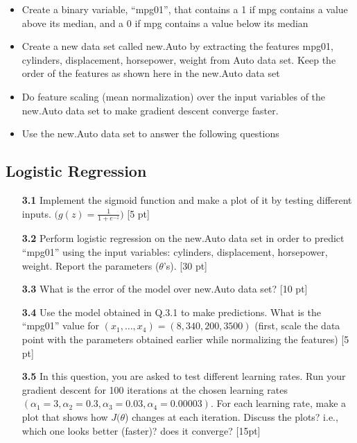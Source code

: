 \documentclass[a4paper,12pt]{article}
\newcommand{\quotes}[1]{``#1''}
\begin{document}
\begin{itemize}
\item  Create a binary variable, \quotes{mpg01}, that contains a 1 if mpg contains a value above its median, and a 0 if mpg contains a value below its median
\item Create a new data set called new.Auto by extracting the features mpg01, cylinders, displacement, horsepower, weight from Auto data set. Keep the order of the features as shown here in the new.Auto data set
\item Do feature scaling (mean normalization) over the input variables of the new.Auto data set to make gradient descent converge faster.
\item Use the new.Auto data set to answer the following questions
\end{itemize}

\subsection*{Logistic Regression } 

\begin{enumerate}
 \item[\textbf{3.1}] Implement the sigmoid function and make a plot of it by testing different inputs. $\big( g(z) = \frac{1}{1+e^{-z}}\big)$ [5 pt]
  \item[\textbf{3.2}] Perform logistic regression on the new.Auto data set in order to predict \quotes{mpg01} using the input variables: cylinders, displacement, horsepower, weight.  Report the parameters ($\theta$'s). [30 pt]
  \item[\textbf{3.3}] What is the error of the model over new.Auto data set? [10 pt]
  \item[\textbf{3.4}]   Use the model obtained in Q.3.1 to make predictions. What is the \quotes{mpg01} value for $(x_1,\ldots,x_4) =  (8,340,200,3500)$ (first, scale the data point with the parameters obtained earlier while normalizing the features) [5 pt]
\item[\textbf{3.5}]In this question, you are asked to test different learning rates. Run your gradient descent for 100 iterations at the chosen learning rates $(\alpha_1 = 3,  \alpha_2 = 0.3, \alpha_3 = 0.03,   \alpha_4 = 0.00003)$. For each learning rate, make a plot that shows how $J(\theta$) changes at each iteration. Discuss the plots? i.e., which one looks better (faster)? does it converge? [15pt]
\end{enumerate}
\end{document}
